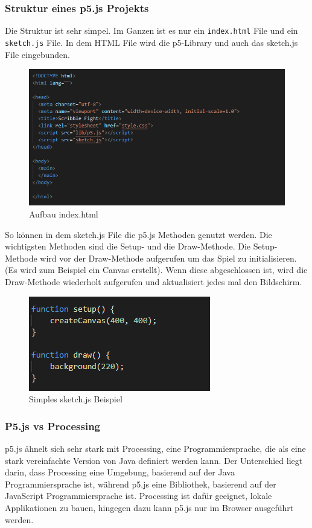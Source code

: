 \subsubsection{Struktur eines p5.js Projekts}
Die Struktur ist sehr simpel. Im Ganzen ist es nur ein \texttt{index.html} File und ein \texttt{sketch.js} File. In dem HTML File wird die p5-Library und auch das sketch.js File eingebunden.

\begin{figure}[H]
    \centering
    \includegraphics[scale=1]{pics/index html.PNG}
    \caption{Aufbau index.html}
\end{figure}

So können in dem sketch.js File die p5.js Methoden genutzt werden. Die wichtigsten Methoden sind die Setup- und die Draw-Methode.
Die Setup-Methode wird vor der Draw-Methode aufgerufen um das Spiel zu initialisieren. (Es wird zum Beispiel ein Canvas erstellt).
Wenn diese abgeschlossen ist, wird die Draw-Methode wiederholt aufgerufen und aktualisiert jedes mal den Bildschirm.

\begin{figure}[H]
    \centering
    \includegraphics[scale=1]{pics/sketch.PNG}
    \caption{Simples sketch.js Beispiel}
\end{figure}

\subsubsection{P5.js vs Processing}
p5.js ähnelt sich sehr stark mit Processing, eine Programmiersprache, die als eine stark vereinfachte Version von Java definiert werden kann.
Der Unterschied liegt darin, dass Processing eine Umgebung, basierend auf der Java Programmiersprache ist, während p5.js eine Bibliothek, basierend auf der JavaScript Programmiersprache ist.
Processing ist dafür geeignet, lokale Applikationen zu bauen, hingegen dazu kann p5.js nur im Browser ausgeführt werden.

